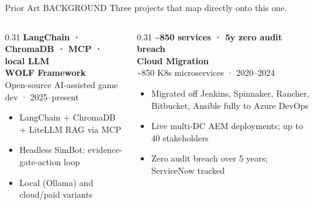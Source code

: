 \documentclass[aspectratio=169,10pt]{beamer}
\newcommand{\slidecat}[1]{{\color{cdim}\ttfamily\scriptsize\MakeUppercase{#1}}}
\begin{document}
\begin{frame}{Prior Art}
  \slidecat{Background}
  {\color{cdim}\small Three projects that map directly onto this one.}
  \vspace{0.12cm}
  \begin{columns}[T,onlytextwidth]
    \begin{column}{0.31\textwidth}
      {\color{cgreen}\ttfamily\tiny\bfseries LangChain · ChromaDB · MCP · local LLM}\\[0.08cm]
      {\color{ctext}\ttfamily\scriptsize\bfseries WOLF Framework}\\[0.04cm]
      {\color{cdim}\tiny Open-source AI-assisted game dev · 2025--present}\\[0.1cm]
      {\color{ctext}\tiny
      \begin{itemize}\setlength\itemsep{1pt}
        \item LangChain + ChromaDB + LiteLLM RAG via MCP
        \item Headless SimBot: evidence-gate-action loop
        \item Local (Ollama) and cloud/paid variants
      \end{itemize}}
      \priorboxend
    \end{column}
    \begin{column}{0.31\textwidth}
      {\color{cteal}\ttfamily\tiny\bfseries \textasciitilde850 services · 5y zero audit breach}\\[0.08cm]
      {\color{ctext}\ttfamily\scriptsize\bfseries Cloud Migration}\\[0.04cm]
      {\color{cdim}\tiny \textasciitilde850 K8s microservices · 2020--2024}\\[0.1cm]
      {\color{ctext}\tiny
      \begin{itemize}\setlength\itemsep{1pt}
        \item Migrated off Jenkins, Spinnaker, Rancher, Bitbucket, Ansible fully to Azure DevOps
        \item Live multi-DC AEM deployments; up to 40 stakeholders
        \item Zero audit breach over 5 years; ServiceNow tracked
      \end{itemize}}
      \priorboxend
    \end{column}

\end{columns}
\end{frame}
\end{document}
